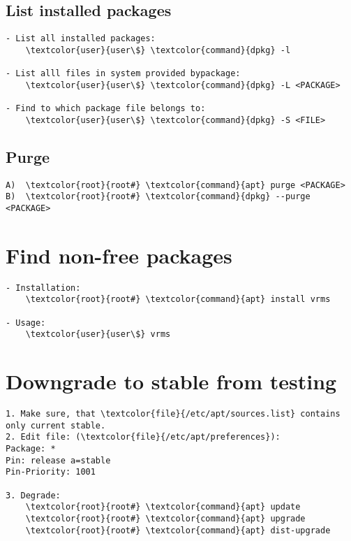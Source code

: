 \documentclass[10pt, a4paper, onecolumn, openany]{book} %
\begin{document}
\subsection{List installed packages}
\begin{Verbatim}[commandchars=\\\{\}]
- List all installed packages:
    \textcolor{user}{user\$} \textcolor{command}{dpkg} -l
    
- List alll files in system provided bypackage:
    \textcolor{user}{user\$} \textcolor{command}{dpkg} -L <PACKAGE>
    
- Find to which package file belongs to:
    \textcolor{user}{user\$} \textcolor{command}{dpkg} -S <FILE>
\end{Verbatim}

\subsection{Purge}
\begin{Verbatim}[commandchars=\\\{\}]
A)  \textcolor{root}{root#} \textcolor{command}{apt} purge <PACKAGE>
B)  \textcolor{root}{root#} \textcolor{command}{dpkg} --purge <PACKAGE>
\end{Verbatim}

\section{Find non-free packages}
\begin{Verbatim}[commandchars=\\\{\}]
- Installation:
    \textcolor{root}{root#} \textcolor{command}{apt} install vrms

- Usage:
    \textcolor{user}{user\$} vrms
\end{Verbatim}

\section{Downgrade to stable from testing}
\begin{Verbatim}[commandchars=\\\{\}]
1. Make sure, that \textcolor{file}{/etc/apt/sources.list} contains only current stable.
2. Edit file: (\textcolor{file}{/etc/apt/preferences}):
Package: *
Pin: release a=stable
Pin-Priority: 1001

3. Degrade:
    \textcolor{root}{root#} \textcolor{command}{apt} update
    \textcolor{root}{root#} \textcolor{command}{apt} upgrade
    \textcolor{root}{root#} \textcolor{command}{apt} dist-upgrade
\end{Verbatim}
\end{document}
